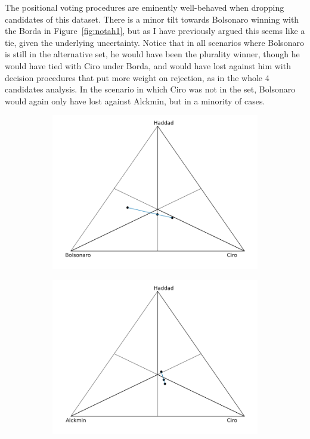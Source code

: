 \documentclass[hidelinks,11pt]{article}
\begin{document}
The positional voting procedures are eminently well-behaved when dropping
candidates of this dataset. There is a minor tilt towards Bolsonaro winning with
the Borda in Figure~\ref{fig:notah1}, but as I have previously argued this seems
like a tie, given the underlying uncertainty. Notice that in all scenarios where
Bolsonaro is still in the alternative set, he would have been the plurality
winner, though he would have tied with Ciro under Borda, and would have lost
against him with decision procedures that put more weight on rejection, as in
the whole 4 candidates analysis. In the scenario in which Ciro was not in the
set, Bolsonaro would again only have lost against Alckmin, but in a minority of
cases.


   \begin{figure}[H]
        \centering
        \begin{subfigure}[b]{0.475\textwidth}
            \centering
            \includegraphics[width=\textwidth]{./images/cw1_nota.png}
             \caption{}%
            \label{fig:notac1}
        \end{subfigure}
        \hfill
        \begin{subfigure}[b]{0.475\textwidth}
            \centering
            \includegraphics[width=\textwidth]{./images/cw1_notb.png}

\end{subfigure}
\end{figure}
\end{document}
